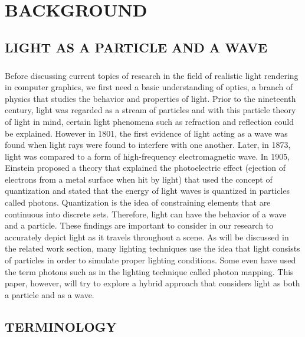 \chapter{BACKGROUND}

\section{LIGHT AS A PARTICLE AND A WAVE}
\paragraph{}
Before discussing current topics of research in the field of realistic light rendering in computer graphics, we first need a basic understanding of optics, a branch of physics that studies the behavior and properties of light.  Prior to the nineteenth century, light was regarded as a stream of particles and with this particle theory of light in mind, certain light phenomena such as refraction and reflection could be explained.  However in 1801, the first evidence of light acting as a wave was found when light rays were found to interfere with one another.  Later, in 1873, light was compared to a form of high-frequency electromagnetic wave.  In 1905, Einstein proposed a theory that explained the photoelectric effect (ejection of electrons from a metal surface when hit by light) that used the concept of quantization and stated that the energy of light waves is quantized in particles called photons. Quantization is the idea of constraining elements that are continuous into discrete sets. \cite{Serway2004}  Therefore, light can have the behavior of a wave and a particle.  These findings are important to consider in our research to accurately depict light as it travels throughout a scene.  As will be discussed in the related work section, many lighting techniques use the idea that light consists of particles in order to simulate proper lighting conditions.  Some even have used the term photons such as in the lighting technique called photon mapping.  This paper, however, will try to explore a hybrid approach that considers light as both a particle and as a wave.

\section{TERMINOLOGY}
